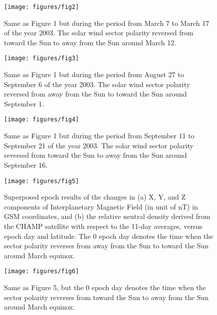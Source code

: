 \documentclass[12pt,a4paper]{article}
\begin{document}
\begin{figure}[!ht]
    \begin{center}
        \texttt{[image: figures/fig2]}
        \caption{Same as Figure 1 but during the period from March 7 to March 17 of the year 2003. The solar wind sector polarity reversed from toward the Sun to away from the Sun around March 12.}
        \label{fig2}
    \end{center}
\end{figure}
\newpage

\begin{figure}[!ht]
    \begin{center}
        \texttt{[image: figures/fig3]}
        \caption{Same as Figure 1 but during the period from August 27 to September 6 of the year 2003. The solar wind sector polarity reversed from away from the Sun to toward the Sun around September 1.}
        \label{fig3}
    \end{center}
\end{figure}
\newpage

\begin{figure}[!ht]
    \begin{center}
        \texttt{[image: figures/fig4]}
        \caption{Same as Figure 1 but during the period from September 11 to September 21 of the year 2003. The solar wind sector polarity reversed from toward the Sun to away from the Sun around September 16.}
        \label{fig4}
    \end{center}
\end{figure}
\newpage

\begin{figure}[!ht]
    \begin{center}
        \texttt{[image: figures/fig5]}
        \caption{Superposed epoch results of the changes in (a) X, Y, and Z components of Interplanetary Magnetic Field (in unit of nT) in GSM coordinates, and (b) the relative  neutral density derived from the CHAMP satellite with respect to the 11-day averages, versus epoch day and latitude. The 0 epoch day denotes the time when the sector polarity reverses from away from the Sun to toward the Sun around March equinox.}
        \label{fig5}
    \end{center}
\end{figure}
\newpage

\begin{figure}[!ht]
    \begin{center}
        \texttt{[image: figures/fig6]}
        \caption{Same as Figure 5, but the 0 epoch day denotes the time when the sector polarity reverses from toward the Sun to away from the Sun around March equinox.}
        \label{fig6}
    \end{center}
\end{figure}
\newpage
\end{document}

